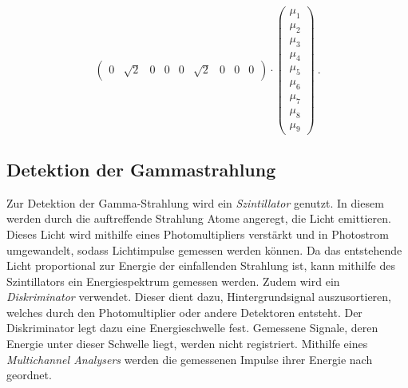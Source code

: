 \begin{equation}
\begin{pmatrix}
            0        & \sqrt{2} & 0        & 0        & 0        & \sqrt{2} & 0        & 0        & 0
        \end{pmatrix}
        \cdot
        \begin{pmatrix}
            \mu_1 \\
            \mu_2 \\
            \mu_3 \\
            \mu_4 \\
            \mu_5 \\
            \mu_6 \\
            \mu_7 \\
            \mu_8 \\
            \mu_9
        \end{pmatrix}
        \ .
    \end{equation}

\subsection{Detektion der Gammastrahlung}

    Zur Detektion der Gamma-Strahlung wird ein \textit{Szintillator} genutzt.
    In diesem werden durch die auftreffende Strahlung Atome angeregt,
    die Licht emittieren.
    Dieses Licht wird mithilfe eines Photomultipliers verstärkt und in Photostrom umgewandelt,
    sodass Lichtimpulse gemessen werden können.
    Da das entstehende Licht proportional zur Energie der einfallenden Strahlung ist,
    kann mithilfe des Szintillators ein Energiespektrum gemessen werden.
    Zudem wird ein \textit{Diskriminator} verwendet.
    Dieser dient dazu,
    Hintergrundsignal auszusortieren,
    welches durch den Photomultiplier oder andere Detektoren entsteht.
    Der Diskriminator legt dazu eine Energieschwelle fest.
    Gemessene Signale,
    deren Energie unter dieser Schwelle liegt,
    werden nicht registriert.
    Mithilfe eines \textit{Multichannel Analysers} werden die gemessenen Impulse ihrer Energie nach geordnet.

